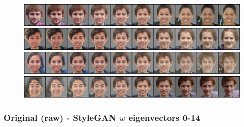 \documentclass{article}
\begin{document}
\begin{figure}[H]
  \includegraphics[width=0.9\linewidth]{eigen/grey_gan_26.png}
  \includegraphics[width=0.9\linewidth]{eigen/grey_gan_27.png}
  \includegraphics[width=0.9\linewidth]{eigen/grey_gan_28.png}
  \includegraphics[width=0.9\linewidth]{eigen/grey_gan_29.png}

\end{figure}
\newpage

\subsubsection*{Original (raw) - StyleGAN $w$ eigenvectors 0-14}
\end{document}
